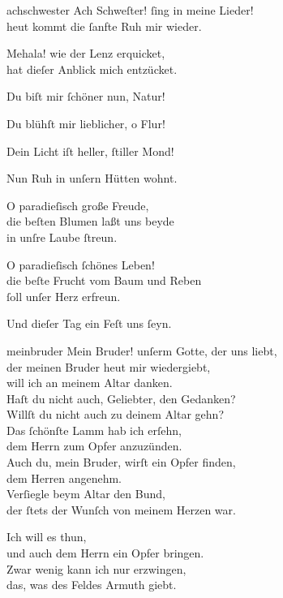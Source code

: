 \documentclass[tocstyle=ref-genre]{ees}
\begin{document}
{\begin{movement}{achschwester}
  \voice[Mehala]
  Ach Schweſter! ſing in meine Lieder!\\
  heut kommt die ſanfte Ruh mir wieder.

  \voice[Thirza]
  Mehala! wie der Lenz erquicket,\\
  hat dieſer Anblick mich entzücket.

  \voice[Mehala]
  Du biſt mir ſchöner nun, Natur!

  \voice[Thirza]
  Du blühſt mir lieblicher, o Flur!

  \voice[Mehala]
  Dein Licht iſt heller, ſtiller Mond!

  \voice[both]
  Nun Ruh in unſern Hütten wohnt.

  \voice[Thirza]
  O paradieſisch große Freude,\\
  die beſten Blumen laßt uns beyde\\
  in unſre Laube ſtreun.

  \voice[Mehala]
  O paradieſisch ſchönes Leben!\\
  die beſte Frucht vom Baum und Reben\\
  ſoll unſer Herz erfreun.

  \voice[both]
  Und dieſer Tag ein Feſt uns ſeyn.
\end{movement}

\begin{movement}{meinbruder}
  \voice[Abel]
  Mein Bruder! unſerm Gotte, der uns liebt,\\
  der meinen Bruder heut mir wiedergiebt,\\
  will ich an meinem Altar danken.\\
  Haſt du nicht auch, Geliebter, den Gedanken?\\
  Willſt du nicht auch zu deinem Altar gehn?\\
  Das ſchönſte Lamm hab ich erſehn,\\
  dem Herrn zum Opfer anzuzünden.\\
  Auch du, mein Bruder, wirſt ein Opfer finden,\\
  dem Herren angenehm.\\
  Verſiegle beym Altar den Bund,\\
  der ſtets der Wunſch von meinem Herzen war.

  \voice[Kain]
  Ich will es thun,\\
  und auch dem Herrn ein Opfer bringen.\\
  Zwar wenig kann ich nur erzwingen,\\
  das, was des Feldes Armuth giebt.


\end{movement}}
\end{document}
